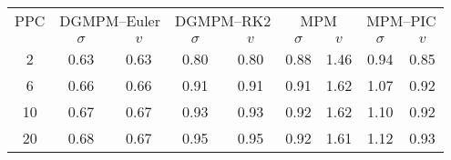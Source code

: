   \begin{tabular}{c|cc|cc|cc|cc}
    \hline
    PPC & \multicolumn{2}{c}{DGMPM--Euler}  \vline & \multicolumn{2}{c}{DGMPM--RK2}\vline  & \multicolumn{2}{c}{MPM} \vline & \multicolumn{2}{c}{MPM--\alert{PIC}}  \\ [6pt]
    & $\sigma$ & $v$  & $\sigma$ & $v$  & $\sigma$ & $v$ & $\sigma$ & $v$\\ 
    \hline
    \hline
    2 & 0.63 & 0.63 & 0.80 &0.80 & 0.88 & \alert{1.46}&0.94& \alert{0.85}\\
    6 & 0.66 & 0.66 & 0.91 &0.91 &  0.91&\alert{1.62}&1.07&\alert{0.92}\\
    10 & 0.67 & 0.67 & 0.93 &0.93 &0.92&\alert{1.62}&1.10&\alert{0.92}\\
    20 & 0.68 & 0.67 & 0.95 &0.95 &0.92&\alert{1.61}&1.12&\alert{0.93}\\
    \hline
  \end{tabular}

